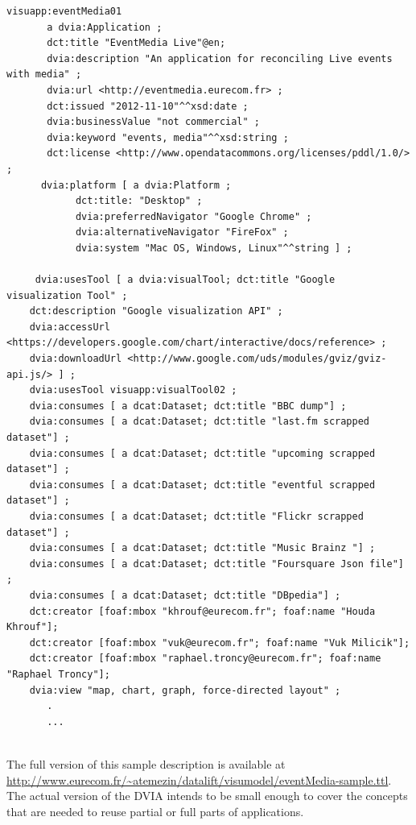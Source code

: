\begin{lstlisting}
visuapp:eventMedia01
       a dvia:Application ; 
       dct:title "EventMedia Live"@en;   
       dvia:description "An application for reconciling Live events with media" ; 
       dvia:url <http://eventmedia.eurecom.fr> ; 
       dct:issued "2012-11-10"^^xsd:date ; 
       dvia:businessValue "not commercial" ;   
       dvia:keyword "events, media"^^xsd:string ; 
       dct:license <http://www.opendatacommons.org/licenses/pddl/1.0/> ; 
      dvia:platform [ a dvia:Platform ; 
			dct:title: "Desktop" ;
			dvia:preferredNavigator "Google Chrome" ; 
			dvia:alternativeNavigator "FireFox" ;
			dvia:system "Mac OS, Windows, Linux"^^string ] ; 
		
     dvia:usesTool [ a dvia:visualTool; dct:title "Google visualization Tool" ; 
	dct:description "Google visualization API" ; 
	dvia:accessUrl <https://developers.google.com/chart/interactive/docs/reference> ; 
	dvia:downloadUrl <http://www.google.com/uds/modules/gviz/gviz-api.js/> ] ;
    dvia:usesTool visuapp:visualTool02 ;
    dvia:consumes [ a dcat:Dataset; dct:title "BBC dump"] ; 
    dvia:consumes [ a dcat:Dataset; dct:title "last.fm scrapped dataset"] ;
    dvia:consumes [ a dcat:Dataset; dct:title "upcoming scrapped dataset"] ;
    dvia:consumes [ a dcat:Dataset; dct:title "eventful scrapped dataset"] ;
    dvia:consumes [ a dcat:Dataset; dct:title "Flickr scrapped dataset"] ;
    dvia:consumes [ a dcat:Dataset; dct:title "Music Brainz "] ;
    dvia:consumes [ a dcat:Dataset; dct:title "Foursquare Json file"] ;
    dvia:consumes [ a dcat:Dataset; dct:title "DBpedia"] ;
    dct:creator [foaf:mbox "khrouf@eurecom.fr"; foaf:name "Houda Khrouf"];
    dct:creator [foaf:mbox "vuk@eurecom.fr"; foaf:name "Vuk Milicik"];
    dct:creator [foaf:mbox "raphael.troncy@eurecom.fr"; foaf:name "Raphael Troncy"];
    dvia:view "map, chart, graph, force-directed layout" ; 
       .
	   ...
	
\end{lstlisting}

The full version of this sample description is available at \url{http://www.eurecom.fr/~atemezin/datalift/visumodel/eventMedia-sample.ttl}. The actual version of the DVIA intends to be small enough to cover the concepts that are needed to reuse partial or full parts of applications. 

